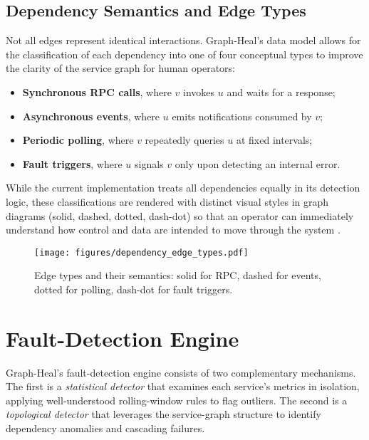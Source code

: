 \documentclass[11pt,conference]{IEEEtran}
\begin{document}
\subsection{Dependency Semantics and Edge Types}
Not all edges represent identical interactions. Graph-Heal's data model allows for the classification of each dependency into one of four conceptual types to improve the clarity of the service graph for human operators:
\begin{itemize}
  \item \textbf{Synchronous RPC calls}, where \(v\) invokes \(u\) and waits for a response;
  \item \textbf{Asynchronous events}, where \(u\) emits notifications consumed by \(v\);
  \item \textbf{Periodic polling}, where \(v\) repeatedly queries \(u\) at fixed intervals;
  \item \textbf{Fault triggers}, where \(u\) signals \(v\) only upon detecting an internal error.
\end{itemize}
While the current implementation treats all dependencies equally in its detection logic, these classifications are rendered with distinct visual styles in graph diagrams (solid, dashed, dotted, dash-dot) so that an operator can immediately understand how control and data are intended to move through the system \cite{wang2019graph}.

\begin{figure}[ht]
  \centering
  \texttt{[image: figures/dependency\_edge\_types.pdf]}
  \caption{Edge types and their semantics: solid for RPC, dashed for events, dotted for polling, dash-dot for fault triggers.}
  \label{fig:edge-types}
\end{figure}





\section{Fault-Detection Engine}
\label{sec:fault-detection}

Graph-Heal's fault-detection engine consists of two complementary mechanisms.  The first is a \emph{statistical detector} that examines each service's metrics in isolation, applying well-understood rolling-window rules to flag outliers.  The second is a \emph{topological detector} that leverages the service-graph structure to identify dependency anomalies and cascading failures.
\end{document}
